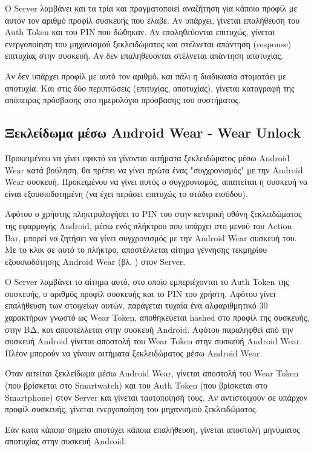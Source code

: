 		Ο Server λαμβάνει και τα τρία και πραγματοποιεί αναζήτηση για κάποιο προφίλ με αυτόν τον αριθμό προφίλ συσκευής που έλαβε. Αν υπάρχει, γίνεται επαλήθευση του Auth Token και του PIN που δώθηκαν. Αν επαληθεύονται επιτυχώς, γίνεται ενεργοποίηση του μηχανισμού ξεκλειδώματος και στέλνεται απάντηση (response) επιτυχίας στην συσκευή. Αν δεν επαληθεύονται στέλνεται απάντηση αποτυχίας.

		Αν δεν υπάρχει προφίλ με αυτό τον αριθμό, και πάλι η διαδικασία σταματάει με αποτυχία. Και στις δύο περιπτώσεις (επιτυχίας, αποτυχίας), γίνεται καταγραφή της απόπειρας πρόσβασης στο ημερολόγιο πρόσβασης του συστήματος.

	\subsection{Ξεκλείδωμα μέσω Android Wear - Wear Unlock}
		Προκειμένου να γίνει εφικτό να γίνονται αιτήματα ξεκλειδώματος μέσω Android Wear κατά βούληση, θα πρέπει να γίνει πρώτα ένας "συγχρονισμός" με την Android Wear συσκευή. Προκειμένου να γίνει αυτός ο συγχρονισμός, απαιτείται η συσκευή να είναι εξουσιοδοτημένη (να έχει περάσει επιτυχώς το στάδιο εισόδου).

		Αφότου ο χρήστης πληκτρολογήσει το PIN του στην κεντρική οθόνη ξεκλειδώματος της εφαρμογής Android, μέσω ενός πλήκτρου που υπάρχει στο μενού του Action Bar, μπορεί να ζητήσει να γίνει συγχρονισμός με την Android Wear συσκευή του. Με το κλικ σε αυτό το πλήκτρο, αποστέλλεται αίτημα γέννησης τεκμηρίου εξουσιοδότησης Android Wear (βλ. ) στον Server.

		Ο Server λαμβάνει το αίτημα αυτό, στο οποίο εμπεριέχονται το Auth Token της συσκευής, ο αριθμός προφίλ συσκευής και το PIN του χρήστη. Αφότου γίνει επαλήθευση των στοιχείων αυτών, παράγεται τυχαία ένα αλφαριθμητικό 30 χαρακτήρων γνωστό ως Wear Token, αποθηκεύεται hashed στο προφίλ της συσκευής, στην ΒΔ, και αποστέλλεται στην συσκευή Android. Αφότου παραληφθεί από την συσκευή Android γίνεται αποστολή του Wear Token στην συσκευή Android Wear. Πλέον μπορούν να γίνουν αιτήματα ξεκλειδώματος μέσω Android Wear.

		Όταν αιτείται ξεκλείδωμα μέσω Android Wear, γίνεται αποστολή του Wear Token (που βρίσκεται στο Smartwatch) και του Auth Token (που βρίσκεται στο Smartphone) στον Server και γίνεται ταυτοποίησή τους. Αν αντιστοιχούν σε υπάρχον προφίλ συσκευής, γίνεται ενεργοποίηση του μηχανισμού ξεκλειδώματος.

		Εάν κατα κάποιο σημείο αποτύχει κάποια επαλήθευση, γίνεται αποστολή μηνύματος αποτυχίας στην συσκευή Android.

